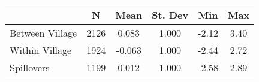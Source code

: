\begin{tabular}{l*{5}{c}}\hline&\multicolumn{1}{c}{N}&\multicolumn{1}{c}{Mean}&\multicolumn{1}{c}{St. Dev}&\multicolumn{1}{c}{Min}&\multicolumn{1}{c}{Max}\\ \hline 
Between Village & 2126 & 0.083 & 1.000 & -2.12 & 3.40 \\
Within Village & 1924 & -0.063 & 1.000 & -2.44 & 2.72 \\
Spillovers & 1199 & 0.012 & 1.000 & -2.58 & 2.89 \\
\hline \end{tabular}

